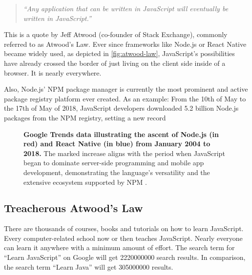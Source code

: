 \documentclass[10pt]{article}
\begin{document}
\begin{sloppypar}
  \begin{quote}
    \emph{“Any application that can be written in JavaScript will eventually be written in JavaScript.” \citep{atwood_principle_2007}}
  \end{quote}

  This is a quote by Jeff Atwood (co-founder of Stack Exchange), commonly referred to as Atwood’s Law. Ever since frameworks like Node.js or React Native became widely used, as depicted in \autoref{fig:atwood-law}, JavaScript’s possibilities have already crossed the border of just living on the client side inside of a browser. It is nearly everywhere.

  Also, Node.js’ NPM package manager is currently the most prominent and active package registry platform ever created. As an example: From the 10th of May to the 17th of May of 2018, JavaScript developers downloaded 5.2 billion Node.js packages from the NPM registry, setting a new record \citep{npm_how_2018}

  \begin{figure}[ht]
    \centering
    \caption[Google Trends data illustrating the ascent of Node.js and React Native.]{\textbf{Google Trends data illustrating the ascent of Node.js (in red) and React Native (in blue) from January 2004 to 2018.} The marked increase aligns with the period when JavaScript began to dominate server-side programming and mobile app development, demonstrating the language’s versatility and the extensive ecosystem supported by NPM \citep{google_google_nodate}.}
    \label{fig:atwood-law}
  \end{figure}

  \subsection{Treacherous Atwood’s Law}
  \label{sec:atwood-law}

  There are thousands of courses, books and tutorials on how to learn JavaScript. Every computer-related school now or then teaches JavaScript. Nearly everyone can learn it anywhere with a minimum amount of effort. The search term for “Learn JavaScript” on Google will get \num{2220000000} search results. In comparison, the search term “Learn Java” will get \num{305000000} results.


\end{sloppypar}
\end{document}

